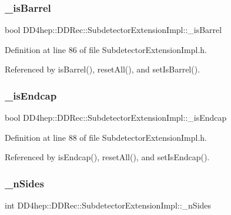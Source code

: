 \subsubsection{\texorpdfstring{\+\_\+is\+Barrel}{\_isBarrel}}
{\footnotesize\ttfamily bool D\+D4hep\+::\+D\+D\+Rec\+::\+Subdetector\+Extension\+Impl\+::\+\_\+is\+Barrel\hspace{0.3cm}{\ttfamily [protected]}}



Definition at line 86 of file Subdetector\+Extension\+Impl.\+h.



Referenced by is\+Barrel(), reset\+All(), and set\+Is\+Barrel().

\hypertarget{class_d_d4hep_1_1_d_d_rec_1_1_subdetector_extension_impl_ab4ac574b15b70218b3c101314002d390}{}\label{class_d_d4hep_1_1_d_d_rec_1_1_subdetector_extension_impl_ab4ac574b15b70218b3c101314002d390} 
\subsubsection{\texorpdfstring{\+\_\+is\+Endcap}{\_isEndcap}}
{\footnotesize\ttfamily bool D\+D4hep\+::\+D\+D\+Rec\+::\+Subdetector\+Extension\+Impl\+::\+\_\+is\+Endcap\hspace{0.3cm}{\ttfamily [protected]}}



Definition at line 88 of file Subdetector\+Extension\+Impl.\+h.



Referenced by is\+Endcap(), reset\+All(), and set\+Is\+Endcap().

\hypertarget{class_d_d4hep_1_1_d_d_rec_1_1_subdetector_extension_impl_a5f3f5b1a0cc55c564536556accc0579a}{}\label{class_d_d4hep_1_1_d_d_rec_1_1_subdetector_extension_impl_a5f3f5b1a0cc55c564536556accc0579a} 
\subsubsection{\texorpdfstring{\+\_\+n\+Sides}{\_nSides}}
{\footnotesize\ttfamily int D\+D4hep\+::\+D\+D\+Rec\+::\+Subdetector\+Extension\+Impl\+::\+\_\+n\+Sides\hspace{0.3cm}{\ttfamily [protected]}}



